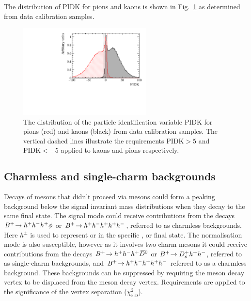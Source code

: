 The distribution of PIDK for pions and kaons is shown in Fig.~\ref{fig:selection_PIDK_distribution} as determined from data calibration samples.
\begin{figure}[!h]
    \centering
        \includegraphics[width=0.6\textwidth]{figs/Selection/Calib_sample_PIDK.pdf}
        \caption{The distribution of the particle identification variable PIDK for pions (red) and kaons (black) from data calibration samples. The vertical dashed lines illustrate the requirements $\text{PIDK}>5$ and $\text{PIDK}<-5$ applied to kaons and pions respectively.}
    \label{fig:selection_PIDK_distribution}   
\end{figure}





\subsection{Charmless and single-charm backgrounds}


Decays of \Bp mesons that didn't proceed via \D mesons could form a peaking background below the signal invariant mass distributions when they decay to the same final state.
The signal mode could receive contributions from the decays ${{{B}^+}}\!\rightarrow h^{+}h^{-}h^{+}\phi$ or ${{{B}^+}}\!\rightarrow h^{+}h^{-}h^{+}h^{+}h^{-}$, referred to as charmless backgrounds. Here $h^{\pm}$ is used to represent \Kpm or \pipm in the specific \Dsp, \Dzb or \phiz final state.
The normalisation mode is also susceptible, however as it involves two charm mesons it could receive contributions from the decays ${{{B}^+}}\!\rightarrow h^{+}h^{-}h^{+}{{\kern 0.2em\overline{\kern -0.2em D}{}}{}^0}$ or ${{{B}^+}}\!\rightarrow {\ensuremath{{D}^+_{s}}} h^{+}h^{-}$, referred to as single-charm backgrounds, and ${{{B}^+}}\!\rightarrow h^{+}h^{-}h^{+} h^{+}h^{-}$ referred to as a charmless background.
These backgrounds can be suppressed by requiring the \D meson decay vertex to be displaced from the \Bp meson decay vertex. Requirements are applied to the significance of the vertex separation ($\chi^{2}_{\text{FD}}$).

